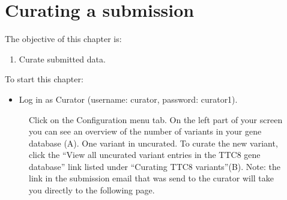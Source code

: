 \chapter{Curating a submission}
The objective of this chapter is:
\begin{enumerate}
	\item 
	Curate submitted data.
\end{enumerate}
To start this chapter:
\begin{itemize}
	\item
	Log in as Curator (username: curator, password: curator1).
\end{itemize}
\begin{figure}[ht]
  \begin{shaded}
	  \caption{
	  Click on the Configuration menu tab.
	  On the left part of your screen you can see an overview of the number of variants in your gene database (A).
	  One variant in uncurated.
	  To curate the new variant, click the ``View all uncurated variant entries in the TTC8 gene database'' 
		 link listed under	``Curating TTC8 variants''(B).\newline
		Note: the link in the submission email that was send to the curator will take you directly to the following page. }
		\label{fig:curate_IA}
  \end{shaded}
\end{figure}

